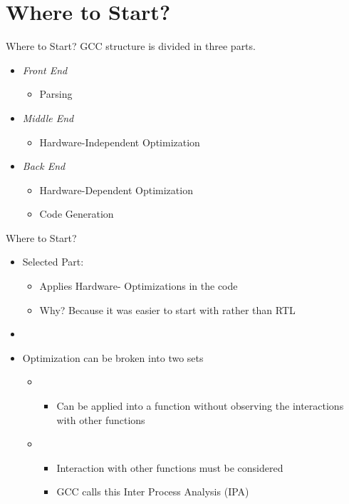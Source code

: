 \section{Where to Start?}

\begin{frame}{Where to Start?}
  GCC structure is divided in three parts.
  \begin{itemize}
    \item \textit{Front End}
        \begin{itemize}
            \item Parsing
        \end{itemize}
    \item \textit{Middle End}
        \begin{itemize}
            \item Hardware-Independent Optimization
        \end{itemize}
    \item \textit{Back End}
        \begin{itemize}
            \item Hardware-Dependent Optimization
            \item Code Generation
        \end{itemize}
  \end{itemize}
\end{frame}

\begin{frame}{Where to Start?}
  \begin{itemize}
    \item Selected Part: {\color{blue}{Middle End}}
    \begin{itemize}
        \item Applies Hardware-{\color{blue}{Independent}} Optimizations in the code
        \item Why? Because it was easier to start with rather than RTL
    \end{itemize}
    \item[]
    \item Optimization can be broken into two {\color{red}{disjoint}} sets
        \begin{itemize}
            \item {\color{blue}{Intra Procedural}}
                \begin{itemize}
                    \item Can be applied into a function without observing the interactions with other functions
                \end{itemize}
            \item {\color{red}{Inter Procedural}}
                \begin{itemize}
                    \item Interaction with other functions must be considered
                    \item GCC calls this Inter Process Analysis (IPA)
                \end{itemize}
        \end{itemize}
  \end{itemize}
\end{frame}

